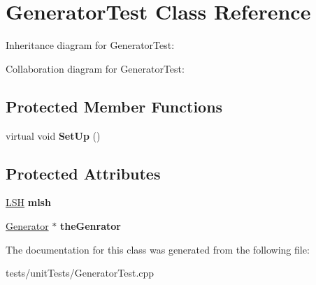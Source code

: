 \hypertarget{classGeneratorTest}{}\section{Generator\+Test Class Reference}
\label{classGeneratorTest}


Inheritance diagram for Generator\+Test\+:


Collaboration diagram for Generator\+Test\+:
\subsection*{Protected Member Functions}
\begin{DoxyCompactItemize}
\item 
virtual void {\bfseries Set\+Up} ()\hypertarget{classGeneratorTest_acbcab64bfcde80c2fa29f7dee0d8e7de}{}\label{classGeneratorTest_acbcab64bfcde80c2fa29f7dee0d8e7de}

\end{DoxyCompactItemize}
\subsection*{Protected Attributes}
\begin{DoxyCompactItemize}
\item 
\hyperlink{classLSH}{L\+SH} {\bfseries mlsh}\hypertarget{classGeneratorTest_a4a374821941d7b6bc6bd511f8dd26bd9}{}\label{classGeneratorTest_a4a374821941d7b6bc6bd511f8dd26bd9}

\item 
\hyperlink{classGenerator}{Generator} $\ast$ {\bfseries the\+Genrator}\hypertarget{classGeneratorTest_ad7f9fae48bf8ac76570c47ec7e892fb2}{}\label{classGeneratorTest_ad7f9fae48bf8ac76570c47ec7e892fb2}

\end{DoxyCompactItemize}


The documentation for this class was generated from the following file\+:\begin{DoxyCompactItemize}
\item 
tests/unit\+Tests/Generator\+Test.\+cpp\end{DoxyCompactItemize}
